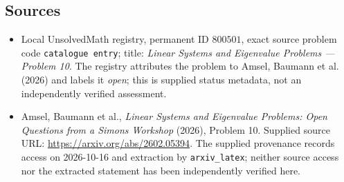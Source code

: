 \documentclass[11pt]{article}
\begin{document}
\subsection{Sources}
\begin{itemize}
\item Local UnsolvedMath registry, permanent ID \(800501\), exact source problem code \texttt{catalogue entry}; title: \emph{Linear Systems and Eigenvalue Problems --- Problem 10}. The registry attributes the problem to Amsel, Baumann et al. (2026) and labels it \emph{open}; this is supplied status metadata, not an independently verified assessment.
\item Amsel, Baumann et al., \emph{Linear Systems and Eigenvalue Problems: Open Questions from a Simons Workshop} (2026), Problem 10. Supplied source URL: \url{https://arxiv.org/abs/2602.05394}. The supplied provenance records access on 2026-10-16 and extraction by \texttt{arxiv\_latex}; neither source access nor the extracted statement has been independently verified here.
\end{itemize}
\end{document}
